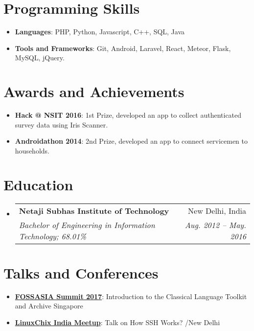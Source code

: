 \documentclass[letterpaper,11pt]{article}
\makeatletter
\newcommand{\resumeItem}[2]{
  \item\small{
    \textbf{#1}{: #2 \vspace{-2pt}}
  }
}
\newcommand{\resumeSubheading}[4]{
  \vspace{-1pt}\item
    \begin{tabular*}{0.97\textwidth}{l@{\extracolsep{\fill}}r}
      \textbf{#1} & #2 \\
      \textit{\small#3} & \textit{\small #4} \\
    \end{tabular*}\vspace{-5pt}
}
\newcommand{\resumeSubItem}[2]{\resumeItem{#1}{#2}\vspace{-4pt}}
\newcommand{\resumeSubHeadingListStart}{\begin{itemize}[leftmargin=*]}
\newcommand{\resumeSubHeadingListEnd}{\end{itemize}}
\makeatother
\begin{document}
\section{Programming Skills}
 \resumeSubHeadingListStart
    \resumeSubItem{Languages}
       {PHP, Python, Javascript, C++, SQL, Java}
    \resumeSubItem{Tools and Frameworks}
       {Git, Android, Laravel, React, Meteor, Flask, MySQL, jQuery.}
 \resumeSubHeadingListEnd

\section{Awards and Achievements}
  \resumeSubHeadingListStart
    \resumeSubItem{Hack @ NSIT 2016}
       {1st Prize, developed an app to collect authenticated survey data using Iris Scanner.}
    \resumeSubItem{Androidathon 2014}
       {2nd Prize, developed an app to connect servicemen to households.}
  \resumeSubHeadingListEnd


\section{Education}
  \resumeSubHeadingListStart
    \resumeSubheading
      {Netaji Subhas Institute of Technology}{New Delhi, India}
      {Bachelor of Engineering in Information Technology;  68.01\%}{Aug. 2012 -- May. 2016}
  \resumeSubHeadingListEnd


\section{Talks and Conferences}
 \resumeSubHeadingListStart
    \resumeSubItem{\href{https://2017.fossasia.org/tracks.html\#2891}{FOSSASIA Summit 2017}}{Introduction to the Classical Language Toolkit and Archive}\hfill{Singapore}
    \resumeSubItem{\href{https://www.meetup.com/en-AU/LinuxChix-India-Meetup/events/242031500/}{LinuxChix India Meetup}}
       {Talk on How SSH Works?}/\hfill{New Delhi}
 \resumeSubHeadingListEnd
\end{document}
